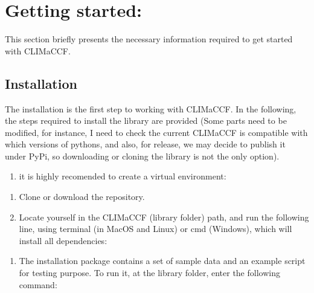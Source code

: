 \documentclass[a4paper,11pt,english]{sphinxmanual}
\begin{document}
\chapter{Getting started:}
\label{\detokenize{index:getting-started}}
\sphinxAtStartPar
This section briefly presents the necessary information required to get started with CLIMaCCF.

\sphinxstepscope


\section{Installation}
\label{\detokenize{gStarted:installation}}\label{\detokenize{gStarted::doc}}
\sphinxAtStartPar
The installation is the first step to working with CLIMaCCF. In the following, the steps required to install the library are provided (Some parts need to be modified,
for instance, I need to check the current CLIMaCCF is compatible with which versions of pythons, and also, for release, we may decide to publish it under
PyPi, so downloading or cloning the library is not the only option).
\begin{enumerate}
%
\setcounter{enumi}{-1}
\item {} 
\sphinxAtStartPar
it is highly recomended to create a virtual environment:

\end{enumerate}

\begin{sphinxVerbatim}[commandchars=\\\{\}]
   
  
\end{sphinxVerbatim}
\begin{enumerate}
%
\item {} 
\sphinxAtStartPar
Clone or download the repository.

\item {} 
\sphinxAtStartPar
Locate yourself in the CLIMaCCF (library folder) path, and run the following line, using terminal (in MacOS and Linux) or cmd (Windows), which will install all dependencies:

\end{enumerate}

\begin{sphinxVerbatim}[commandchars=\\\{\}]
  
\end{sphinxVerbatim}
\begin{enumerate}
%
\setcounter{enumi}{2}
\item {} 
\sphinxAtStartPar
The installation package contains a set of sample data and an example script for testing purpose. To run it, at the library folder, enter the following command:

\end{enumerate}
\end{document}
